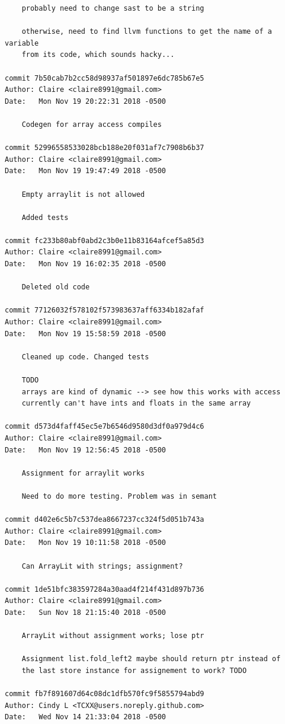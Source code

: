 \documentclass[12pt]{article}
\begin{document}
\begin{lstlisting}
    probably need to change sast to be a string
    
    otherwise, need to find llvm functions to get the name of a variable
    from its code, which sounds hacky...

commit 7b50cab7b2cc58d98937af501897e6dc785b67e5
Author: Claire <claire8991@gmail.com>
Date:   Mon Nov 19 20:22:31 2018 -0500

    Codegen for array access compiles

commit 52996558533028bcb188e20f031af7c7908b6b37
Author: Claire <claire8991@gmail.com>
Date:   Mon Nov 19 19:47:49 2018 -0500

    Empty arraylit is not allowed
    
    Added tests

commit fc233b80abf0abd2c3b0e11b83164afcef5a85d3
Author: Claire <claire8991@gmail.com>
Date:   Mon Nov 19 16:02:35 2018 -0500

    Deleted old code

commit 77126032f578102f573983637aff6334b182afaf
Author: Claire <claire8991@gmail.com>
Date:   Mon Nov 19 15:58:59 2018 -0500

    Cleaned up code. Changed tests
    
    TODO
    arrays are kind of dynamic --> see how this works with access
    currently can't have ints and floats in the same array

commit d573d4faff45ec5e7b6546d9580d3df0a979d4c6
Author: Claire <claire8991@gmail.com>
Date:   Mon Nov 19 12:56:45 2018 -0500

    Assignment for arraylit works
    
    Need to do more testing. Problem was in semant

commit d402e6c5b7c537dea8667237cc324f5d051b743a
Author: Claire <claire8991@gmail.com>
Date:   Mon Nov 19 10:11:58 2018 -0500

    Can ArrayLit with strings; assignment?

commit 1de51bfc383597284a30aad4f214f431d897b736
Author: Claire <claire8991@gmail.com>
Date:   Sun Nov 18 21:15:40 2018 -0500

    ArrayLit without assignment works; lose ptr
    
    Assignment list.fold_left2 maybe should return ptr instead of
    the last store instance for assignement to work? TODO

commit fb7f891607d64c08dc1dfb570fc9f5855794abd9
Author: Cindy L <TCXX@users.noreply.github.com>
Date:   Wed Nov 14 21:33:04 2018 -0500


\end{lstlisting}
\end{document}
